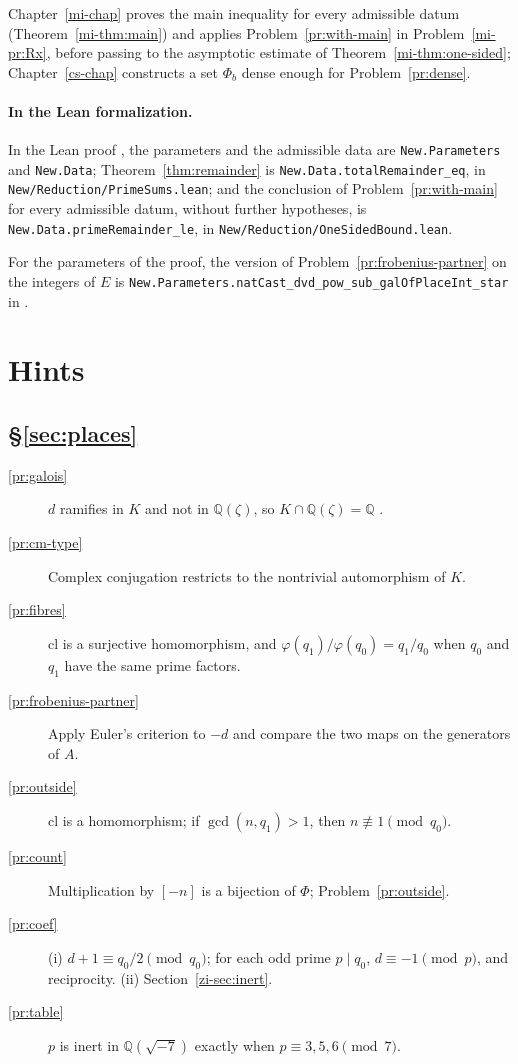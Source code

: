 \documentclass[reqno]{amsart}
\newcounter{chap}
\theoremstyle{definition}
\theoremstyle{plain}
\newcommand{\Q}{\mathbb{Q}}
\begin{document}
Chapter~\ref{mi-chap} proves the main inequality for every admissible datum (Theorem~\ref{mi-thm:main}) and applies Problem~\ref{pr:with-main} in Problem~\ref{mi-pr:Rx}, before passing to the asymptotic estimate of Theorem~\ref{mi-thm:one-sided}; Chapter~\ref{cs-chap} constructs a set \(\Phi_b\) dense enough for Problem~\ref{pr:dense}.

\paragraph{In the Lean formalization.}
In the Lean proof \cite{GL}, the parameters and the admissible data are \texttt{New.Parameters} and \texttt{New.Data}; Theorem~\ref{thm:remainder} is \texttt{New.Data.totalRemainder\_eq}, in \texttt{New/Reduction/PrimeSums.lean}; and the conclusion of Problem~\ref{pr:with-main} for every admissible datum, without further hypotheses, is \texttt{New.Data.primeRemainder\_le}, in \texttt{New/Reduction/OneSidedBound.lean}.

For the parameters of the proof, the version of Problem~\ref{pr:frobenius-partner} on the integers of \(E\) is \texttt{New.Parameters.}\allowbreak\texttt{natCast\_dvd\_pow\_sub\_galOfPlaceInt\_star} in .

\section*{Hints}

\subsection*{\S\ref{sec:places}}
\begin{description}
\item[\ref{pr:galois}] \(d\) ramifies in \(K\) and not in \(\Q(\zeta)\), so \(K \cap \Q(\zeta) = \Q\) \cite[Ch.~2]{Wa}.
\item[\ref{pr:cm-type}] Complex conjugation restricts to the nontrivial automorphism of \(K\).
\item[\ref{pr:fibres}] \(\mathrm{cl}\) is a surjective homomorphism, and \(\varphi(q_1)/\varphi(q_0) = q_1/q_0\) when \(q_0\) and \(q_1\) have the same prime factors.
\item[\ref{pr:frobenius-partner}] Apply Euler's criterion to \(-d\) and compare the two maps on the generators of \(A\).
\item[\ref{pr:outside}] \(\mathrm{cl}\) is a homomorphism; if \(\gcd(n, q_1) > 1\), then \(n \not\equiv 1 \pmod{q_0}\).
\item[\ref{pr:count}] Multiplication by \([-n]\) is a bijection of \(\Phi\); Problem~\ref{pr:outside}.
\item[\ref{pr:coef}] (i) \(d + 1 \equiv q_0/2 \pmod{q_0}\); for each odd prime \(p \mid q_0\), \(d \equiv -1 \pmod p\), and reciprocity.  (ii) Section~\ref{zi-sec:inert}.
\item[\ref{pr:table}] \(p\) is inert in \(\Q(\sqrt{-7})\) exactly when \(p \equiv 3, 5, 6 \pmod 7\).
\end{description}
\end{document}
